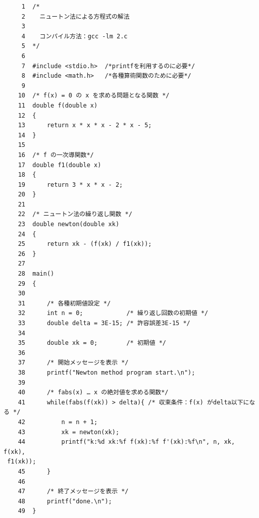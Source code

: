 \documentclass[12pt]{jarticle}
\renewcommand  \[  {\begin{eqnarray}}
\renewcommand  \]  {\end{eqnarray}}
\begin{document}
\begin{verbatim}
     1	/*
     2	  ニュートン法による方程式の解法
     3	
     4	  コンパイル方法：gcc -lm 2.c
     5	*/
     6	
     7	#include <stdio.h>  /*printfを利用するのに必要*/
     8	#include <math.h>   /*各種算術関数のために必要*/
     9	
    10	/* f(x) = 0 の x を求める問題となる関数 */
    11	double f(double x)
    12	{
    13	    return x * x * x - 2 * x - 5;
    14	}
    15	
    16	/* f の一次導関数*/
    17	double f1(double x)
    18	{
    19	    return 3 * x * x - 2;
    20	}
    21	
    22	/* ニュートン法の繰り返し関数 */
    23	double newton(double xk)
    24	{
    25	    return xk - (f(xk) / f1(xk));
    26	}
    27	
    28	main()
    29	{
    30	
    31	    /* 各種初期値設定 */
    32	    int n = 0;            /* 繰り返し回数の初期値 */
    33	    double delta = 3E-15; /* 許容誤差3E-15 */
    34	
    35	    double xk = 0;        /* 初期値 */
    36	
    37	    /* 開始メッセージを表示 */
    38	    printf("Newton method program start.\n");
    39	
    40	    /* fabs(x) … x の絶対値を求める関数*/
    41	    while(fabs(f(xk)) > delta){ /* 収束条件：f(x) がdelta以下になる */
    42	        n = n + 1;
    43	        xk = newton(xk);
    44	        printf("k:%d xk:%f f(xk):%f f'(xk):%f\n", n, xk, f(xk),
 f1(xk));
    45	    }
    46	
    47	    /* 終了メッセージを表示 */
    48	    printf("done.\n");
    49	}
\end{verbatim}
\end{document}
